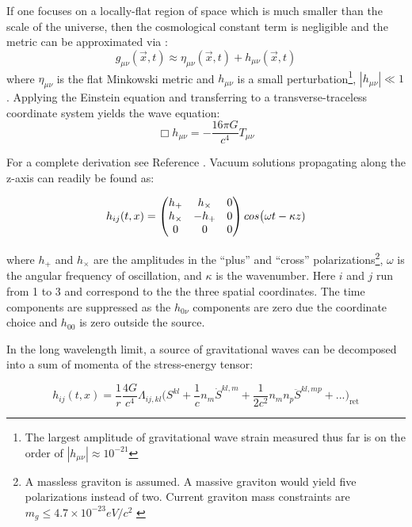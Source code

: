 \documentclass [12pt, proquest]{uwthesis}[2019]
\begin{document}
If one focuses on a locally-flat region of space which is much smaller than the scale of the universe, then the cosmological constant term is negligible and the metric can be approximated via \cite{GWBook}:
\begin{equation}
g_{\mu \nu}(\vec x,t)\approx\eta_{\mu \nu}(\vec x,t)+h_{\mu \nu}(\vec x,t)
\end{equation}
where $\eta_{\mu \nu}$ is the flat Minkowski metric and $h_{\mu \nu}$ is a small perturbation\footnote{The largest amplitude of gravitational wave strain measured thus far is on the order of $|h_{\mu \nu}|\approx 10^{-21}$\cite{GW150914}}, $|h_{\mu \nu}|\ll 1$. Applying the Einstein equation and transferring to a transverse-traceless coordinate system yields the wave equation:
\begin{equation}
\Box h_{\mu \nu}=-\frac{16 \pi G}{c^4}T_{\mu \nu}
\end{equation}

For a complete derivation see Reference \cite{GWBook}. Vacuum solutions propagating along the z-axis can readily be found as:

\begin{equation}
h_{ij}(t,x)=\begin{pmatrix} h_+ & h_\times & 0 \\ h_\times & -h_+ & 0 \\ 0 & 0 & 0\end{pmatrix} \\cos\big(\omega t - \kappa z)
\end{equation}

where $h_+$ and $h_\times$ are the amplitudes in the ``plus'' and ``cross'' polarizations\footnote{A massless graviton is assumed. A massive graviton would yield five polarizations instead of two. Current graviton mass constraints are $m_g\leq 4.7\times 10^{-23} eV/c^2$ \cite{graviton}}, $\omega$ is the angular frequency of oscillation, and $\kappa$ is the wavenumber. Here $i$ and $j$ run from 1 to 3 and correspond to the the three spatial coordinates. The time components are suppressed as the $h_{0\nu}$ components are zero due the coordinate choice and $h_{00}$ is zero outside the source. 

In the long wavelength limit, a source of gravitational waves can be decomposed into a sum of momenta of the stress-energy tensor:

\begin{equation}
h_{ij}(t,x)=\frac{1}{r}\frac{4 G}{c^4} \Lambda_{ij,kl} \bigg( S^{kl} +\frac{1}{c} n_m \dot{S}^{kl,m} +\frac{1}{2c^2} n_m n_p \ddot{S}^{kl,mp}+...\bigg)_\text{ret} \label{gwExp}
\end{equation}
\end{document}
